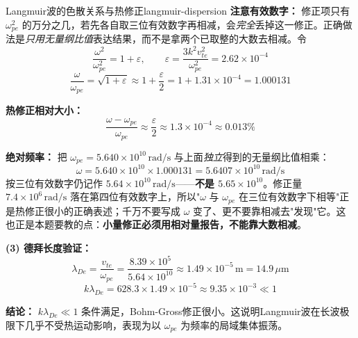 \begin{example}{Langmuir波的色散关系与热修正}{langmuir-dispersion}
\textbf{注意有效数字：} 修正项只有 $\omega_{pe}^2$ 的万分之几，若先各自取三位有效数字再相减，会\emph{完全}丢掉这一修正。正确做法是\emph{只用无量纲比值}表达结果，而不是拿两个已取整的大数去相减。令
\[
\frac{\omega^2}{\omega_{pe}^2} = 1 + \varepsilon, \qquad \varepsilon = \frac{3k^2v_{te}^2}{\omega_{pe}^2} = 2.62\times 10^{-4}
\]
\[
\frac{\omega}{\omega_{pe}} = \sqrt{1+\varepsilon} \approx 1 + \frac{\varepsilon}{2} = 1 + 1.31\times 10^{-4} = 1.000131
\]

\textbf{热修正相对大小：}
\[
\frac{\omega - \omega_{pe}}{\omega_{pe}} \approx \frac{\varepsilon}{2} \approx 1.3\times 10^{-4} \approx 0.013\%
\]

\textbf{绝对频率：} 把 $\omega_{pe}=5.640\times 10^{10}\,\mathrm{rad/s}$ 与上面\emph{独立}得到的无量纲比值相乘：
\[
\omega = 5.640\times 10^{10}\times 1.000131 = 5.6407\times 10^{10}\,\mathrm{rad/s}
\]
按三位有效数字仍记作 $\boxed{5.64\times 10^{10}\,\mathrm{rad/s}}$——\textbf{不是 $5.65\times 10^{10}$}。修正量 $7.4\times10^6\,\mathrm{rad/s}$ 落在第四位有效数字上，所以"$\omega$ 与 $\omega_{pe}$ 在三位有效数字下相等"正是热修正很小的正确表述；千万不要写成 $\omega$ 变了、更不要靠相减去"发现"它。这也正是本题要教的点：\textbf{小量修正必须用相对量报告，不能靠大数相减}。

\textbf{(3) 德拜长度验证：}
\[
\lambda_{De} = \frac{v_{te}}{\omega_{pe}} = \frac{8.39\times 10^5}{5.64\times 10^{10}} \approx 1.49\times 10^{-5}\,\mathrm{m} = 14.9\,\mu\mathrm{m}
\]
\[
k\lambda_{De} = 628.3\times 1.49\times 10^{-5} \approx 9.35\times 10^{-3} \ll 1
\]

\textbf{结论：} $k\lambda_{De}\ll 1$ 条件满足，Bohm-Gross修正很小。这说明Langmuir波在长波极限下几乎不受热运动影响，表现为以 $\omega_{pe}$ 为频率的局域集体振荡。
\end{example}

